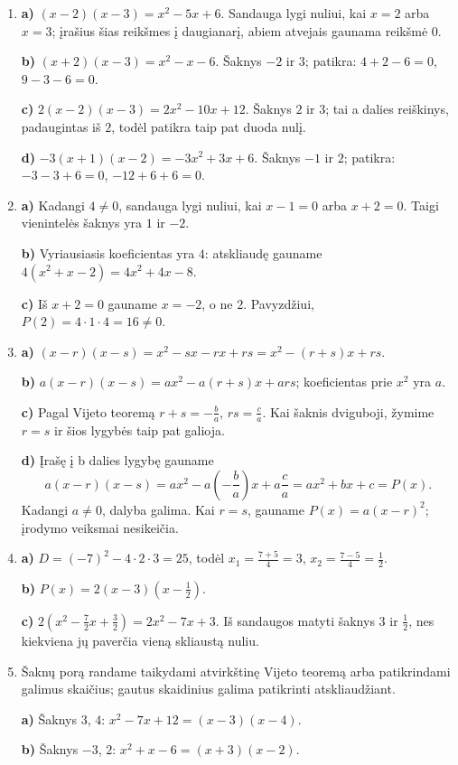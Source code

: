 \documentclass[12pt,a4paper]{article}
\begin{document}
\begin{enumerate}
\item \textbf{a)} $(x-2)(x-3)=x^2-5x+6$. Sandauga lygi nuliui, kai $x=2$ arba $x=3$; įrašius šias reikšmes į daugianarį, abiem atvejais gaunama reikšmė $0$.

\textbf{b)} $(x+2)(x-3)=x^2-x-6$. Šaknys $-2$ ir $3$; patikra: $4+2-6=0$, $9-3-6=0$.

\textbf{c)} $2(x-2)(x-3)=2x^2-10x+12$. Šaknys $2$ ir $3$; tai a dalies reiškinys, padaugintas iš $2$, todėl patikra taip pat duoda nulį.

\textbf{d)} $-3(x+1)(x-2)=-3x^2+3x+6$. Šaknys $-1$ ir $2$; patikra: $-3-3+6=0$, $-12+6+6=0$.
\item \textbf{a)} Kadangi $4\ne0$, sandauga lygi nuliui, kai $x-1=0$ arba $x+2=0$. Taigi vienintelės šaknys yra $1$ ir $-2$.

\textbf{b)} Vyriausiasis koeficientas yra $4$: atskliaudę gauname $4(x^2+x-2)=4x^2+4x-8$.

\textbf{c)} Iš $x+2=0$ gauname $x=-2$, o ne $2$. Pavyzdžiui, $P(2)=4\cdot1\cdot4=16\ne0$.
\item \textbf{a)} $(x-r)(x-s)=x^2-sx-rx+rs=x^2-(r+s)x+rs$.

\textbf{b)} $a(x-r)(x-s)=ax^2-a(r+s)x+ars$; koeficientas prie $x^2$ yra $a$.

\textbf{c)} Pagal Vijeto teoremą $r+s=-\frac{b}{a}$, $rs=\frac{c}{a}$. Kai šaknis dviguboji, žymime $r=s$ ir šios lygybės taip pat galioja.

\textbf{d)} Įrašę į b dalies lygybę gauname
\[a(x-r)(x-s)=ax^2-a\left(-\frac{b}{a}\right)x+a\frac{c}{a}=ax^2+bx+c=P(x).\]
Kadangi $a\ne0$, dalyba galima. Kai $r=s$, gauname $P(x)=a(x-r)^2$; įrodymo veiksmai nesikeičia.
\item \textbf{a)} $D=(-7)^2-4\cdot2\cdot3=25$, todėl $x_1=\frac{7+5}{4}=3$, $x_2=\frac{7-5}{4}=\frac{1}{2}$.

\textbf{b)} $P(x)=2(x-3)\left(x-\frac{1}{2}\right)$.

\textbf{c)} $2\left(x^2-\frac{7}{2}x+\frac{3}{2}\right)=2x^2-7x+3$. Iš sandaugos matyti šaknys $3$ ir $\frac{1}{2}$, nes kiekviena jų paverčia vieną skliaustą nuliu.
\item Šaknų porą randame taikydami atvirkštinę Vijeto teoremą arba patikrindami galimus skaičius; gautus skaidinius galima patikrinti atskliaudžiant.

\textbf{a)} Šaknys $3$, $4$: $x^2-7x+12=(x-3)(x-4)$.

\textbf{b)} Šaknys $-3$, $2$: $x^2+x-6=(x+3)(x-2)$.


\end{enumerate}
\end{document}
